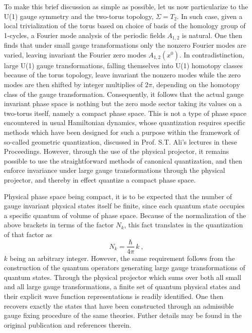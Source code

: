\documentclass[a4paper,11pt]{article}
\begin{document}
To make this brief discussion as simple as possible, let us now particularize
to the U(1) gauge symmetry and the two-torus topology, $\Sigma=T_2$. In such
case, given a local trivialization of the torus based on choice of basis
of the homology group of 1-cycles, a Fourier mode analysis of the periodic
fields $A_{1,2}$ is natural. One then finds that under small gauge 
transformations only the nonzero Fourier modes are varied, leaving invariant
the Fourier zero modes $A_{1,2}(x^0)$. In contradistinction, large U(1) gauge
transformations, falling themselves into U(1) homotopy classes because of
the torus topology, leave invariant the nonzero modes while the
zero modes are then shifted by integer multiplies of $2\pi$, depending
on the homotopy class of the gauge transformation. Consequently, it
follows that the actual gauge invariant phase space is nothing but the
zero mode sector taking its values on a two-torus itself, namely a compact
phase space. This is not a type of phase space encountered in usual
Hamiltonian dynamics, whose quantization requires specific methods
which have been designed for such a purpose within the framework of
so-called geometric quantization, discussed in Prof. S.T. Ali's lectures
in these Proceedings.
However, through the use of the physical projector, it remains possible
to use the straightforward methods of canonical quantization, and then
enforce invariance under large gauge transformations through the physical
projector, and thereby in effect quantize a compact phase space.

Physical phase space being compact, it is to be expected that the number of
gauge invariant physical states itself be finite, since each quantum state
occupies a specific quantum of volume of phase space. Because of the
nor\-ma\-li\-za\-tion of the above brackets in terms of the factor $N_k$, 
this fact translates in the quantization of that factor as
\begin{equation}
N_k=\frac{\hbar}{4\pi}\,k\ ,
\end{equation}
$k$ being an arbitrary integer. However, the same requirement follows
from the construction of the quantum operators generating large gauge
transformations of quantum states. Through the physical projector
which sums over both all small and all large gauge transformations,
a finite set of quantum physical states and their explicit wave
function representations is readily identified. One then recovers exactly
the states that have been constructed through an admissible
gauge fixing procedure of the same theories. Futher details may be
found in the original publication and references therein.\cite{JG2bis,JG9}
\end{document}
